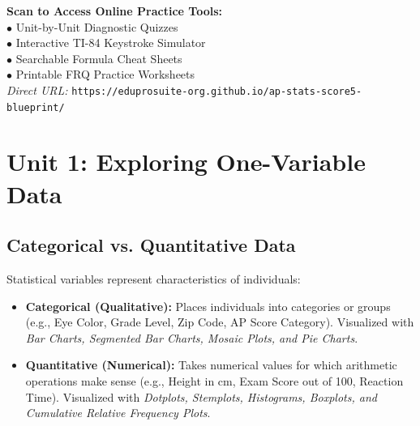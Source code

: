 \documentclass[11pt,oneside,openany]{book}
\begin{document}
\begin{center}
\begin{tcolorbox}[width=0.95\linewidth,colback=NavyBlue!5!white,colframe=NavyBlue,title=\textbf{FREE DIGITAL WEB COMPANION PORTAL}]
\begin{minipage}{0.65\linewidth}
  \textbf{Scan to Access Online Practice Tools:}\\
  $\bullet$ Unit-by-Unit Diagnostic Quizzes\\
  $\bullet$ Interactive TI-84 Keystroke Simulator\\
  $\bullet$ Searchable Formula Cheat Sheets\\
  $\bullet$ Printable FRQ Practice Worksheets\\[4pt]
  \textit{Direct URL:} \texttt{https://eduprosuite-org.github.io/ap-stats-score5-blueprint/}
\end{minipage}
\hfill
\begin{minipage}{0.30\linewidth}
  \centering
\end{minipage}
\end{tcolorbox}
\end{center}

\mainmatter

\chapter{Unit 1: Exploring One-Variable Data}

\section{Categorical vs. Quantitative Data}
\begin{lessonbox}
Statistical variables represent characteristics of individuals:
\begin{itemize}[leftmargin=1.2em]
  \item \textbf{Categorical (Qualitative):} Places individuals into categories or groups (e.g., Eye Color, Grade Level, Zip Code, AP Score Category). Visualized with \textit{Bar Charts, Segmented Bar Charts, Mosaic Plots, and Pie Charts}.
  \item \textbf{Quantitative (Numerical):} Takes numerical values for which arithmetic operations make sense (e.g., Height in cm, Exam Score out of 100, Reaction Time). Visualized with \textit{Dotplots, Stemplots, Histograms, Boxplots, and Cumulative Relative Frequency Plots}.
\end{itemize}
\end{lessonbox}
\end{document}
